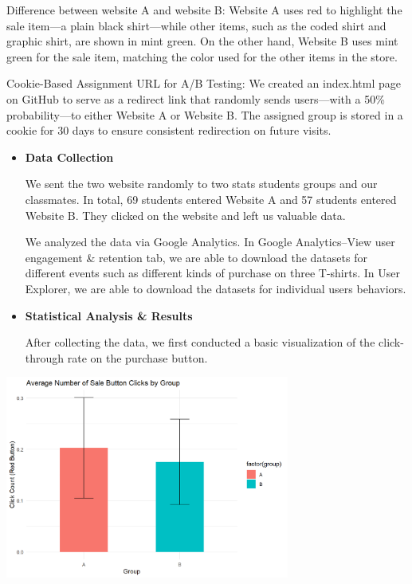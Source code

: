 \documentclass[
  letterpaper,
  DIV=11,
  numbers=noendperiod]{scrartcl}
\begin{document}
\begin{itemize}
  Difference between website A and website B: Website A uses red to
  highlight the sale item---a plain black shirt---while other items,
  such as the coded shirt and graphic shirt, are shown in mint green. On
  the other hand, Website B uses mint green for the sale item, matching
  the color used for the other items in the store.
\end{itemize}

Cookie-Based Assignment URL for A/B Testing: We created an index.html
page on GitHub to serve as a redirect link that randomly sends
users---with a 50\% probability---to either Website A or Website B. The
assigned group is stored in a cookie for 30 days to ensure consistent
redirection on future visits.

\begin{itemize}
\item
  \textbf{Data Collection}

  We sent the two website randomly to two stats students groups and our
  classmates. In total, 69 students entered Website A and 57 students
  entered Website B. They clicked on the website and left us valuable
  data.

  We analyzed the data via Google Analytics. In Google Analytics--View
  user engagement \& retention tab, we are able to download the datasets
  for different events such as different kinds of purchase on three
  T-shirts. In User Explorer, we are able to download the datasets for
  individual users behaviors.
\end{itemize}

\begin{itemize}
\item
  \textbf{Statistical Analysis \& Results}

  After collecting the data, we first conducted a basic visualization of
  the click-through rate on the purchase button.\\
\end{itemize}

\begin{center}
\includegraphics[width=0.7\textwidth,height=\textheight]{data_ana_pj3_files/figure-html/unnamed-chunk-3-1.png}
\end{center}
\\
\end{document}
